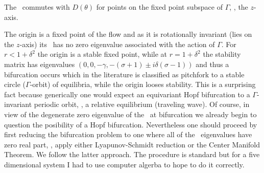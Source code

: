The \stabmat\ commutes with ${D}(\theta)$ for points on the
fixed point subspace of $\Gamma$, \ie, the $z$-axis.

The origin is a fixed point of the flow and as it is rotationally invariant (lies on the $z$-axis)
its \stabmat\ has no zero eigenvalue associated with the action of $\Gamma$. For $r<1+\delta^2$
the origin is a stable fixed point, while at $r=1+\delta^2$ the stability
matrix has eigenvalues $ \left(0,0,-\gamma ,-(\sigma+1) \pm i \delta  (\sigma-1) \right)$
and  thus a bifurcation occurs which in the literature is classified as pitchfork to a
stable circle ($\Gamma$-orbit) of equilibria, while the origin looses stability. This is a surprising
fact because generically  one would expect an equivariant Hopf bifurcation to a $\Gamma$-invariant periodic
orbit, \ie, a relative equilibrium (traveling wave). Of course, in view of the degenerate zero eigenvalue
of the \stabmat\ at bifurcation we already begin to question the posibility of a Hopf bifurcation.
Nevertheless one should proceed by first reducing the bifurcation problem to one where all of the \stabmat\ eigenvalues
have zero real part, \ie, apply either Lyapunov-Schmidt reduction or the Center Manifold Theorem.
We follow the latter approach. The procedure is standard but for a five dimensional system I had to use computer algerba
to hope to do it correctly.

